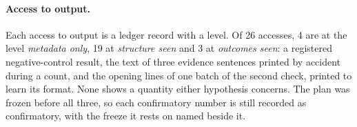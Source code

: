 \paragraph{Access to output.} Each access to output is a ledger record with a level. Of 26
accesses, 4 are at the level \emph{metadata only}, 19 at \emph{structure seen} and 3 at
\emph{outcomes seen}: a registered negative-control result, the text of three evidence
sentences printed by accident during a count, and the opening lines of one batch of the second
check, printed to learn its format. None shows a quantity either hypothesis concerns.
The plan was frozen before all three, so each confirmatory number is still recorded as confirmatory,
with the freeze it rests on named beside it.
